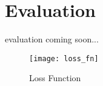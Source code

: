 \section{Evaluation} %
\label{sec:evaluation}

evaluation coming soon...

\begin{figure}
  \begin{center}
    \texttt{[image: loss\_fn]}
  \end{center}
  \caption{Loss Function}\label{fig:loss-fn}
\end{figure}



